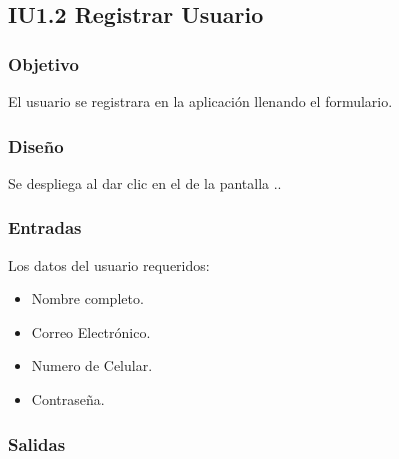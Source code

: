 \newpage
\subsection{IU1.2 Registrar Usuario}

\subsubsection{Objetivo}
	El usuario se  registrara en la aplicación llenando el formulario.

\subsubsection{Diseño}
	Se despliega al dar clic en el  de la pantalla ..


\subsubsection{Entradas}
Los datos del usuario requeridos:
\begin{itemize}
	\item Nombre completo.
	\item Correo Electrónico.
	\item Numero de Celular.
	\item Contraseña.
\end{itemize}

\subsubsection{Salidas}
\begin{Citemize}
	\item {}
	\item {}
	\item {}
	\item {}
	\item {}
	\item {}
	\item {}
	\item {}
\end{Citemize}
